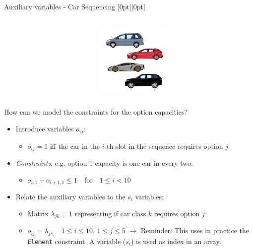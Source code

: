 \documentclass{cons-beamer}
\begin{document}
\begin{frame}{Auxiliary variables - Car Sequencing}
  \raisebox{-\height}[0pt][0pt]{%
    \begin{columns}
      \begin{column}{0.7\textwidth}
            
      \end{column}
      \begin{column}{0.3\textwidth}
        \includegraphics[height=35mm]{images/car_seq.png}%
      \end{column}
    \end{columns}
  }

  How can we model the constraints for the option capacities?
  \vfill

  \begin{itemize}
    \item Introduce  variables \(o_{ij}\):
      \begin{itemize}
        \item \(o_{ij} = 1\) iff the car in the \(i\)-th slot in the sequence requires option \(j\)
      \end{itemize}
      \vfill

    \item \textit{Constraints}, e.g. option 1 capacity is one car in every two:
      \begin{itemize}
        \item \(o_{i,1} + o_{i+1,1} \leq 1 \quad \text{for} \quad 1 \leq i < 10\)
      \end{itemize}
      \vfill

    \item Relate the auxiliary variables to the \(s_i\) variables:
      \begin{itemize}
        \item Matrix \(\lambda_{jk} = 1\) representing if car class \(k\) requires option \(j\)
        \item \(o_{ij} = \lambda_{js_i} \quad 1 \leq i \leq 10, \, 1 \leq j \leq 5\) 
              $\xrightarrow{}$ \alert{Reminder: This uses in practice the \texttt{Element} constraint. A variable ($s_i$) is used as index in an array.}
      \end{itemize}
  \end{itemize}
\end{frame}
\end{document}
